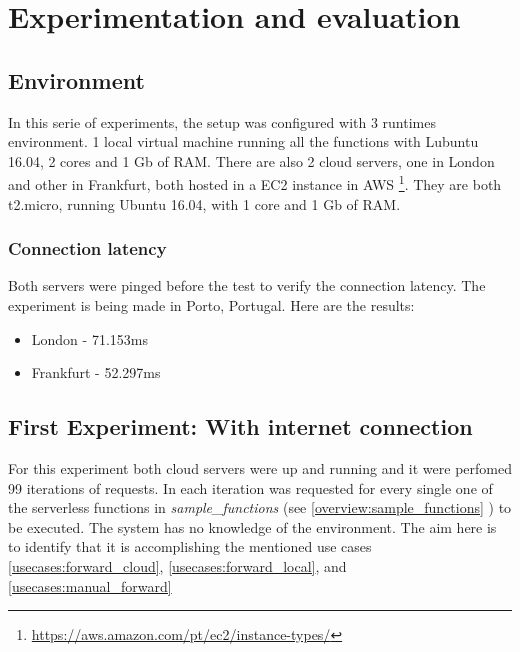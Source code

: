 \section{Experimentation and evaluation}
\subsection{Environment}
In this serie of experiments, the setup was configured with 3 runtimes environment.
1 local virtual machine running all the functions with Lubuntu 16.04, 2 cores and
1 Gb of RAM. There are also 2 cloud servers, one in London and other in Frankfurt,
both  hosted in a EC2 instance in AWS
\footnote{\url{https://aws.amazon.com/pt/ec2/instance-types/}}. They are both
t2.micro, running Ubuntu 16.04, with 1 core and 1 Gb of RAM.

\subsubsection*{Connection latency}
\label{res:conn_latency}
Both servers were pinged before the test to verify the connection latency. The
experiment is being made in Porto, Portugal. Here are the results: 
\begin{itemize}
    \item London - 71.153ms
    \item Frankfurt - 52.297ms
\end{itemize}


\subsection{First Experiment: With internet connection}
For this experiment both cloud servers were up and running and it were perfomed
99 iterations of requests. In each iteration was requested for every single one
of the serverless functions in \textit{sample\_functions} (see
\ref{overview:sample_functions} ) to be executed.
The system has no knowledge of the environment. The aim here is to identify
that it is accomplishing the mentioned use cases \ref{usecases:forward_cloud},
\ref{usecases:forward_local}, and \ref{usecases:manual_forward}


